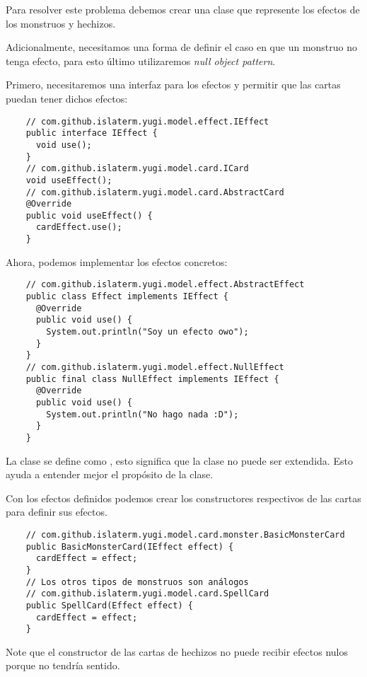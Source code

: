 \begin{Answer}[ref={ex:null-1}]
  Para resolver este problema debemos crear una clase que represente los efectos de los
  monstruos y hechizos.
  
  Adicionalmente, necesitamos una forma de definir el caso en que un monstruo no tenga 
  efecto, para esto último utilizaremos \textit{null object pattern}.
  
  Primero, necesitaremos una interfaz para los efectos y permitir que las cartas puedan
  tener dichos efectos:
  \begin{verbatim}
    // com.github.islaterm.yugi.model.effect.IEffect
    public interface IEffect {
      void use();
    }
    // com.github.islaterm.yugi.model.card.ICard
    void useEffect();
    // com.github.islaterm.yugi.model.card.AbstractCard
    @Override
    public void useEffect() {
      cardEffect.use();
    }      
  \end{verbatim}

  Ahora, podemos implementar los efectos concretos:
  \begin{verbatim}
    // com.github.islaterm.yugi.model.effect.AbstractEffect
    public class Effect implements IEffect {
      @Override
      public void use() {
        System.out.println("Soy un efecto owo");
      }
    }
    // com.github.islaterm.yugi.model.effect.NullEffect
    public final class NullEffect implements IEffect {
      @Override
      public void use() {
        System.out.println("No hago nada :D");
      }
    }
  \end{verbatim}
  La clase  se define como , esto significa que la clase no
  puede ser extendida.
  Esto ayuda a entender mejor el propósito de la clase.
  
  Con los efectos definidos podemos crear los constructores respectivos de las cartas 
  para definir sus efectos.
  \begin{verbatim}
    // com.github.islaterm.yugi.model.card.monster.BasicMonsterCard
    public BasicMonsterCard(IEffect effect) {
      cardEffect = effect;
    }
    // Los otros tipos de monstruos son análogos
    // com.github.islaterm.yugi.model.card.SpellCard
    public SpellCard(Effect effect) {
      cardEffect = effect;
    }
  \end{verbatim}

  Note que el constructor de las cartas de hechizos no puede recibir efectos nulos 
  porque no tendría sentido.
\end{Answer}